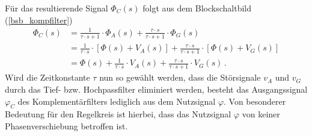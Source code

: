 Für das resultierende Signal $\varPhi_C(s)$ folgt aus dem Blockschaltbild (\ref{bsb_kompfilter})
\begin{equation}
\begin{split}
\varPhi_C(s) &= \frac{1}{\tau \cdot s + 1}\cdot \varPhi_A(s) + \frac{\tau \cdot s}{\tau\cdot s + 1}\cdot \varPhi_G(s)
\\
&= \frac{1}{\tau\cdot s}\cdot \left[\varPhi(s) + V_A(s)\right] + \frac{\tau\cdot s}{\tau\cdot s + 1}\cdot \left[\varPhi(s) + V_G(s)\right]
\\
&= \varPhi(s) + \frac{1}{\tau\cdot s}\cdot V_A(s) + \frac{\tau\cdot s}{\tau\cdot s + 1}\cdot V_G(s) \,.
\end{split}
\end{equation}
Wird die Zeitkonstante $\tau$ nun so gewählt werden, dass die Störsignale $v_A$ und $v_G$ durch das Tief- bzw. Hochpassfilter eliminiert werden, besteht das Ausgangssignal $\varphi_C$ des Komplementärfilters lediglich aus dem Nutzsignal $\varphi$. Von besonderer Bedeutung für den Regelkreis ist hierbei, dass das Nutzsignal $\varphi$ von keiner Phasenverschiebung betroffen ist.

